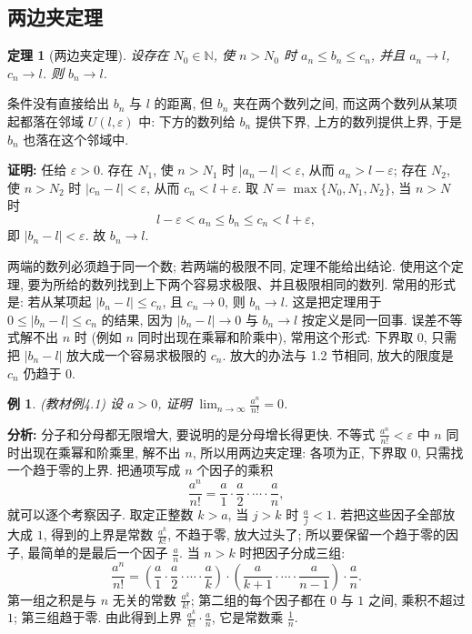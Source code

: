 \documentclass[UTF8,openany]{ctexbook}
\theoremstyle{chinesetextbook}
\newtheorem{example}{例}[section]
\newtheorem{theorem}{定理}[section]
\newenvironment{cnproof}{\par\indent\textbf{证明:} \ignorespaces}{\par}
\begin{document}
\subsection{两边夹定理}
\begin{theorem}[两边夹定理]
设存在 $N_0\in\mathbb N$, 使 $n>N_0$ 时 $a_n\le b_n\le c_n$, 并且 $a_n\to l$, $c_n\to l$. 则 $b_n\to l$.
\end{theorem}
条件没有直接给出 $b_n$ 与 $l$ 的距离, 但 $b_n$ 夹在两个数列之间, 而这两个数列从某项起都落在邻域 $U(l,\varepsilon)$ 中: 下方的数列给 $b_n$ 提供下界, 上方的数列提供上界, 于是 $b_n$ 也落在这个邻域中.
\begin{cnproof}
任给 $\varepsilon>0$. 存在 $N_1$, 使 $n>N_1$ 时 $|a_n-l|<\varepsilon$, 从而 $a_n>l-\varepsilon$; 存在 $N_2$, 使 $n>N_2$ 时 $|c_n-l|<\varepsilon$, 从而 $c_n<l+\varepsilon$. 取 $N=\max\{N_0,N_1,N_2\}$, 当 $n>N$ 时
\[
l-\varepsilon<a_n\le b_n\le c_n<l+\varepsilon,
\]
即 $|b_n-l|<\varepsilon$. 故 $b_n\to l$.
\end{cnproof}
两端的数列必须趋于同一个数; 若两端的极限不同, 定理不能给出结论. 使用这个定理, 要为所给的数列找到上下两个容易求极限、并且极限相同的数列. 常用的形式是: 若从某项起 $|b_n-l|\le c_n$, 且 $c_n\to0$, 则 $b_n\to l$. 这是把定理用于 $0\le|b_n-l|\le c_n$ 的结果, 因为 $|b_n-l|\to0$ 与 $b_n\to l$ 按定义是同一回事. 误差不等式解不出 $n$ 时 (例如 $n$ 同时出现在乘幂和阶乘中), 常用这个形式: 下界取 $0$, 只需把 $|b_n-l|$ 放大成一个容易求极限的 $c_n$. 放大的办法与 1.2 节相同, 放大的限度是 $c_n$ 仍趋于 $0$.
\begin{example}\label{ex:4-1}
\textnormal{(教材例4.1)} 设 $a>0$, 证明 $\displaystyle\lim_{n\to\infty}\frac{a^n}{n!}=0$.
\end{example}
\par\indent\textbf{分析:} 分子和分母都无限增大, 要说明的是分母增长得更快. 不等式 $\displaystyle\frac{a^n}{n!}<\varepsilon$ 中 $n$ 同时出现在乘幂和阶乘里, 解不出 $n$, 所以用两边夹定理: 各项为正, 下界取 $0$, 只需找一个趋于零的上界. 把通项写成 $n$ 个因子的乘积
\[
\frac{a^n}{n!}=\frac a1\cdot\frac a2\cdot\cdots\cdot\frac an,
\]
就可以逐个考察因子. 取定正整数 $k>a$, 当 $j>k$ 时 $\displaystyle\frac aj<1$. 若把这些因子全部放大成 $1$, 得到的上界是常数 $\displaystyle\frac{a^k}{k!}$, 不趋于零, 放大过头了; 所以要保留一个趋于零的因子, 最简单的是最后一个因子 $\displaystyle\frac an$. 当 $n>k$ 时把因子分成三组:
\[
\frac{a^n}{n!}=\left(\frac a1\cdot\frac a2\cdot\cdots\cdot\frac ak\right)\cdot\left(\frac a{k+1}\cdot\cdots\cdot\frac a{n-1}\right)\cdot\frac an.
\]
第一组之积是与 $n$ 无关的常数 $\displaystyle\frac{a^k}{k!}$; 第二组的每个因子都在 $0$ 与 $1$ 之间, 乘积不超过 $1$; 第三组趋于零. 由此得到上界 $\displaystyle\frac{a^k}{k!}\cdot\frac an$, 它是常数乘 $\displaystyle\frac1n$.
\end{document}
